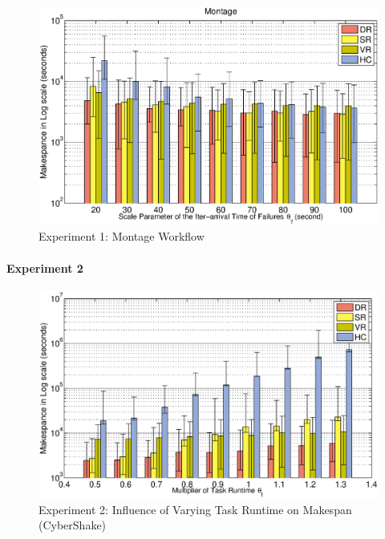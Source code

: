 


\begin{figure}[!htb]
\centering
  \includegraphics[width=1\linewidth]{figures/tolerance/montage.eps}
  \caption{Experiment 1: Montage Workflow}
  \label{fig:expr_montage}
\end{figure}

\paragraph{\textbf{Experiment 2}}

\begin{figure}[!htb]
\centering
  \includegraphics[width=1\linewidth]{figures/tolerance/t.eps}
  \caption{Experiment 2:  Influence of Varying Task Runtime on Makespan (CyberShake)}
  \label{fig:expr_t}
\end{figure}

